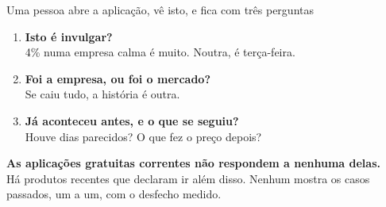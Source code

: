 \documentclass[aspectratio=169]{beamer}
\begin{document}
\begin{frame}{Uma pessoa abre a aplicação, vê isto, e fica com três perguntas}
\begin{center}
\end{center}
\vspace{1mm}
\begin{enumerate}
  \item[\textbf{1.}] \textbf{Isto é invulgar?}\\
        \footnotesize 4\% numa empresa calma é muito. Noutra, é terça-feira.\\[2mm]
  \item[\textbf{2.}] \textbf{Foi a empresa, ou foi o mercado?}\\
        \footnotesize Se caiu tudo, a história é outra.\\[2mm]
  \item[\textbf{3.}] \textbf{Já aconteceu antes, e o que se seguiu?}\\
        \footnotesize Houve dias parecidos? O que fez o preço depois?
\end{enumerate}
\vspace{2mm}
\begin{center}
\textbf{As aplicações gratuitas correntes não respondem a nenhuma delas.}\\[1mm]
\footnotesize Há produtos recentes que declaram ir além disso. Nenhum mostra os casos
passados, um a um, com o desfecho medido.
\end{center}
\end{frame}
\end{document}
